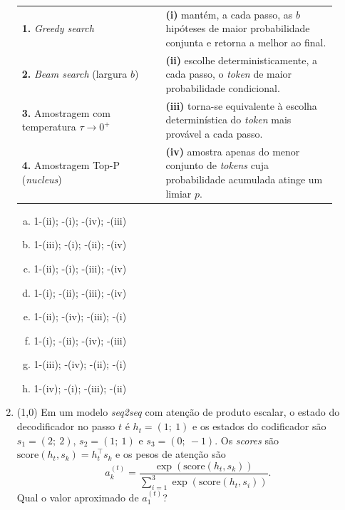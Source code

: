 \documentclass[11pt,a4paper]{article}
\begin{document}
\begin{enumerate}[1)]
\begin{center}
\begin{tabular}{p{0.42\linewidth} p{0.5\linewidth}}
\textbf{1.} \textit{Greedy search} & \textbf{(i)} mantém, a cada passo, as $b$ hipóteses de maior probabilidade conjunta e retorna a melhor ao final. \\
\textbf{2.} \textit{Beam search} (largura $b$) & \textbf{(ii)} escolhe deterministicamente, a cada passo, o \textit{token} de maior probabilidade condicional. \\
\textbf{3.} Amostragem com temperatura $\tau \to 0^{+}$ & \textbf{(iii)} torna-se equivalente à escolha determinística do \textit{token} mais provável a cada passo. \\
\textbf{4.} Amostragem Top-P (\textit{nucleus}) & \textbf{(iv)} amostra apenas do menor conjunto de \textit{tokens} cuja probabilidade acumulada atinge um limiar $p$. \\
\end{tabular}
\end{center}

\begin{enumerate}[a)]
    \item 1-(ii); -(i); -(iv); -(iii)
    \item 1-(iii); -(i); -(ii); -(iv)
    \item 1-(ii); -(i); -(iii); -(iv)
    \item 1-(i); -(ii); -(iii); -(iv)
    \item 1-(ii); -(iv); -(iii); -(i)
    \item 1-(i); -(ii); -(iv); -(iii)
    \item 1-(iii); -(iv); -(ii); -(i)
    \item 1-(iv); -(i); -(iii); -(ii)
\end{enumerate}

\item (1{,}0) Em um modelo \textit{seq2seq} com atenção de produto escalar, o estado do decodificador no passo $t$ é $h_t = (1;\ 1)$ e os estados do codificador são $s_1 = (2;\ 2)$, $s_2 = (1;\ 1)$ e $s_3 = (0;\ -1)$. Os \textit{scores} são $\mathrm{score}(h_t, s_k) = h_t^{\top} s_k$ e os pesos de atenção são
\[
a_k^{(t)} = \frac{\exp(\mathrm{score}(h_t, s_k))}{\sum_{i=1}^{3}\exp(\mathrm{score}(h_t, s_i))}.
\]
Qual o valor aproximado de $a_1^{(t)}$?


\end{enumerate}
\end{document}
